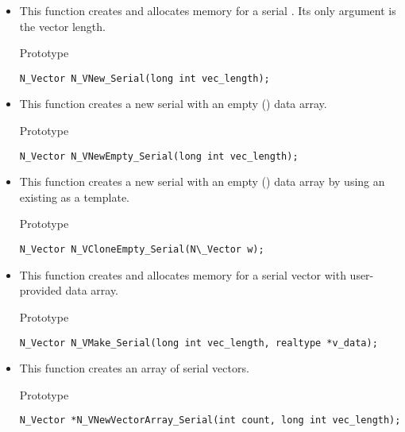 \begin{itemize}


\item {}

  This function creates and allocates memory for a serial .
  Its only argument is the vector length.

  Prototype

  \verb|N_Vector N_VNew_Serial(long int vec_length);|


\item {}

  This function creates a new serial  with an empty () data array.

  Prototype

  \verb|N_Vector N_VNewEmpty_Serial(long int vec_length);|


\item {}

  This function creates a new serial  with an empty () data array
  by using an existing  as a template.

  Prototype

  \verb|N_Vector N_VCloneEmpty_Serial(N\_Vector w);|


\item {}

 This function creates and allocates memory for a serial vector
 with user-provided data array.

 Prototype

 \verb|N_Vector N_VMake_Serial(long int vec_length, realtype *v_data);|


\item {}

 This function creates an array of  serial vectors.

 Prototype

 \verb|N_Vector *N_VNewVectorArray_Serial(int count, long int vec_length);|



\end{itemize}
